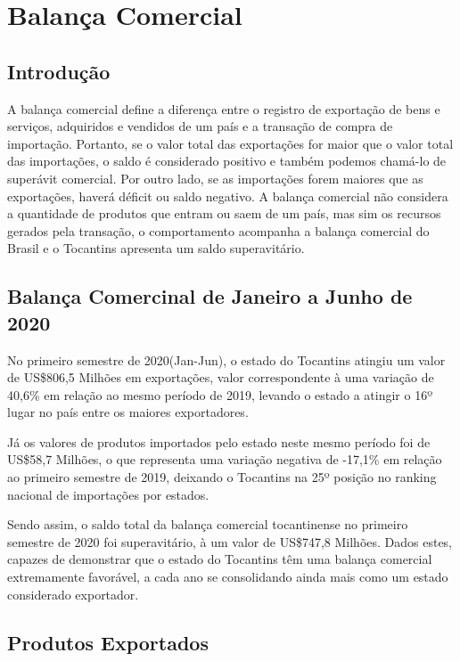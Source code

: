 \chapter{Balança Comercial}
\section{Introdução}
\par A balança comercial define a diferença entre o registro de exportação de bens e serviços, adquiridos e vendidos de um país e a transação de compra de importação. Portanto, se o valor total das exportações for maior que o valor total das importações, o saldo é considerado positivo e também podemos chamá-lo de superávit comercial. Por outro lado, se as importações forem maiores que as exportações, haverá déficit ou saldo negativo. A balança comercial não considera a quantidade de produtos que entram ou saem de um país, mas sim os recursos gerados pela transação, o comportamento acompanha a balança comercial do Brasil e o Tocantins apresenta um saldo superavitário.

\section{Balança Comercinal de Janeiro a Junho de 2020}
\par No primeiro semestre de 2020(Jan-Jun), o estado do Tocantins atingiu um valor de US\$806,5 Milhões em exportações, valor correspondente à uma variação de 40,6\% em relação ao mesmo período de 2019, levando o estado a atingir o 16º lugar no país entre os maiores exportadores. 

\par Já os valores de produtos importados pelo estado neste mesmo período foi de US\$58,7 Milhões, o que representa uma variação negativa de -17,1\% em relação ao primeiro semestre de 2019, deixando o Tocantins na 25º posição no ranking nacional de importações por estados.

\par Sendo assim, o saldo total da balança comercial tocantinense no primeiro semestre de 2020 foi superavitário, à um valor de US\$747,8 Milhões. Dados estes, capazes de demonstrar que o estado do Tocantins têm uma balança comercial extremamente favorável, a cada ano se consolidando ainda mais como um estado considerado exportador.

\section{Produtos Exportados}
